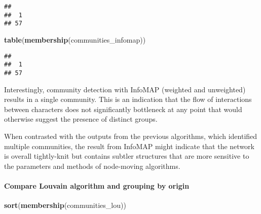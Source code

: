 \documentclass[
]{article}
\newenvironment{Shaded}{\begin{snugshade}}{\end{snugshade}}
\newcommand{\FunctionTok}[1]{\textcolor[rgb]{0.13,0.29,0.53}{\textbf{#1}}}
\newcommand{\NormalTok}[1]{#1}
\begin{document}
\begin{verbatim}
## 
##  1 
## 57
\end{verbatim}

\begin{Shaded}
\begin{Highlighting}[]
\FunctionTok{table}\NormalTok{(}\FunctionTok{membership}\NormalTok{(communities\_infomap))}
\end{Highlighting}
\end{Shaded}

\begin{verbatim}
## 
##  1 
## 57
\end{verbatim}

Interestingly, community detection with InfoMAP (weighted and
unweighted) results in a single community. This is an indication that
the flow of interactions between characters does not significantly
bottleneck at any point that would otherwise suggest the presence of
distinct groups.

When contrasted with the outputs from the previous algorithms, which
identified multiple communities, the result from InfoMAP might indicate
that the network is overall tightly-knit but contains subtler structures
that are more sensitive to the parameters and methods of node-moving
algorithms.

\hypertarget{compare-louvain-algorithm-and-grouping-by-origin}{%
\paragraph{Compare Louvain algorithm and grouping by
origin}\label{compare-louvain-algorithm-and-grouping-by-origin}}

\begin{Shaded}
\begin{Highlighting}[]
\FunctionTok{sort}\NormalTok{(}\FunctionTok{membership}\NormalTok{(communities\_lou))}
\end{Highlighting}
\end{Shaded}
\end{document}
